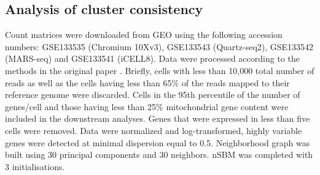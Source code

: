 \documentclass{bmcart}
\begin{document}
\subsection*{Analysis of cluster consistency}

Count matrices were downloaded from GEO using the following accession numbers: GSE133535 (Chromium 10Xv3), GSE133543 (Quartz-seq2), GSE133542 (MARS-seq) and GSE133541 (iCELL8). Data were processed according to the methods in the original paper \cite{mereu_2020}. Briefly, cells with less than 10,000 total number of reads as well as the cells having less than 65\% of the reads mapped to their reference genome were discarded. Cells in the 95th percentile of the number of genes/cell and those having less than 25\% mitochondrial gene content were included in the downstream analyses. Genes that were expressed in less than five cells were removed. Data were normalized and log-transformed, highly variable genes were detected at minimal dispersion equal to 0.5. Neighborhood graph was built using 30 principal components and 30 neighbors. nSBM was completed with 3 initialisations. 



\end{document}
